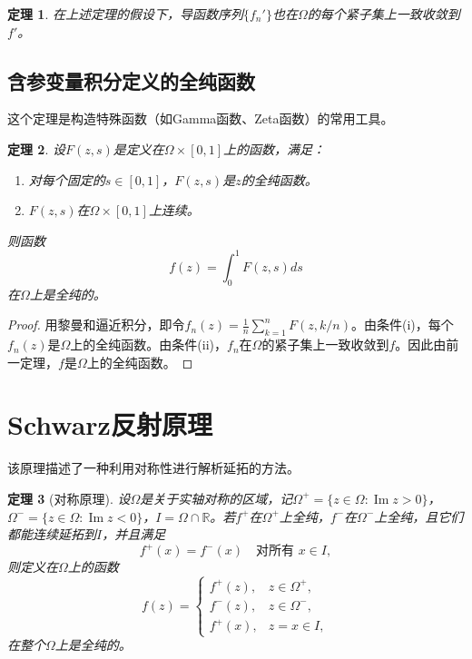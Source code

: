 \documentclass[UTF8]{ctexart}
\newtheorem{theorem}{定理}[section]
\numberwithin{equation}{section}
\newcommand{\RR}{\mathbb{R}}
\begin{document}
\begin{theorem}
    在上述定理的假设下，导函数序列$\{f_n'\}$也在$\Omega$的每个紧子集上一致收敛到$f'$。
\end{theorem}

\subsection{含参变量积分定义的全纯函数}

这个定理是构造特殊函数（如Gamma函数、Zeta函数）的常用工具。

\begin{theorem}
    设$F(z,s)$是定义在$\Omega\times[0,1]$上的函数，满足：
    \begin{enumerate}
        \item 对每个固定的$s\in[0,1]$，$F(z,s)$是$z$的全纯函数。
        \item $F(z,s)$在$\Omega\times[0,1]$上连续。
    \end{enumerate}
    则函数
    \[
    f(z) = \int_0^1 F(z,s) ds
    \]
    在$\Omega$上是全纯的。
\end{theorem}

\begin{proof}
    用黎曼和逼近积分，即令$f_n(z)=\frac{1}{n}\sum_{k=1}^n F(z,k/n)$。由条件(i)，每个$f_n(z)$是$\Omega$上的全纯函数。由条件(ii)，$f_n$在$\Omega$的紧子集上一致收敛到$f$。因此由前一定理，$f$是$\Omega$上的全纯函数。
\end{proof}

\section{Schwarz反射原理}

该原理描述了一种利用对称性进行解析延拓的方法。
\begin{theorem}[对称原理]
    设$\Omega$是关于实轴对称的区域，记$\Omega^+=\{z\in\Omega:\operatorname{Im}z>0\}$，$\Omega^-=\{z\in\Omega:\operatorname{Im}z<0\}$，$I=\Omega\cap\RR$。若$f^+$在$\Omega^+$上全纯，$f^-$在$\Omega^-$上全纯，且它们都能连续延拓到$I$，并且满足
    \[
    f^+(x)=f^-(x) \quad \text{对所有 } x\in I,
    \]
    则定义在$\Omega$上的函数
    \[
    f(z)=\begin{cases}
        f^+(z), & z\in\Omega^+,\\
        f^-(z), & z\in\Omega^-,\\
        f^+(x), & z=x\in I,
    \end{cases}
    \]
    在整个$\Omega$上是全纯的。
\end{theorem}
\end{document}
